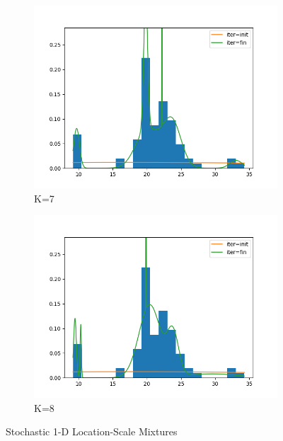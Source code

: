 \begin{figure}
\begin{subfigure}[b]{0.3\textwidth}
         \centering
         \includegraphics[width=\textwidth]{../code/stochastic_loc_scale_plots/galaxies_hist_k_7.png}
         \caption{K=7}
         \label{fig:Stoch_loc_scale7}
     \end{subfigure}
     \hfill
     \begin{subfigure}[b]{0.3\textwidth}
         \centering
         \includegraphics[width=\textwidth]{../code/stochastic_loc_scale_plots/galaxies_hist_k_8.png}
         \caption{K=8}
         \label{fig:Stoch_loc_scale8}
     \end{subfigure}
        \caption{Stochastic 1-D Location-Scale Mixtures}
        \label{fig:Stoch_loc_scale}
\end{figure}
